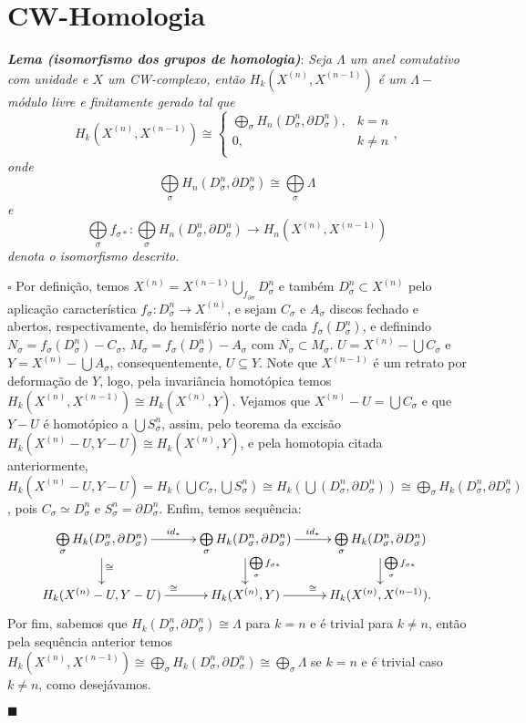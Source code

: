 \documentclass[12pt]{book}
\newcommand{\celula}[2]{D^{#1}_{#2}}
\newcommand{\celulabordo}[2]{\partial D^{#1}_{#2}}
\newcommand{\skeleton}[1]{X^{(#1)}}
\newcommand{\homologia}[2]{H_{#1}(#2)}
\newcommand{\homologiarel}[3]{H_{#1}(#2,#3)}
\newcommand{\homologiarelcel}[3]{H_{#1}(D^{#2}_{#3}, \partial D^{#2}_{#3})}
\newcommand{\homologiarelskelesimpl}[2]{H_{#1}(X^{(#2)}, X^{(#2-1)})}
\newcommand{\somadir}[1]{\bigoplus \limits_{#1}}
\newcommand{\tese}[3]{\vspace{2mm} \textit{\textbf{#1}}: \textit{#2} \par $\square$ #3 \par $\blacksquare$}
\begin{document}
	\section{CW-Homologia}
	\tese{Lema (isomorfismo dos grupos de homologia)}{Seja $\Lambda$ um anel comutativo com unidade e $X$ um CW-complexo, então $\homologiarelskelesimpl{k}{n} $ é um $\Lambda-$módulo livre e finitamente gerado tal que
	$$
	\homologiarelskelesimpl{k}{n} \cong 
	\left\{
		\begin{array}{cc}
		\somadir{\sigma} \homologiarelcel{n}{n}{\sigma} , & k = n\\
		0, & k\neq n\\
		\end{array}
	\right.,
	$$
	onde 
	$$
	\somadir{\sigma} \homologiarelcel{n}{n}{\sigma} \cong \somadir{\sigma} \Lambda
	$$
	e
	$$
	\somadir{\sigma}f_{\sigma*}: \somadir{\sigma} \homologiarelcel{n}{n}{\sigma} \to \homologiarelskelesimpl{n}{n}
	$$
	denota o isomorfismo descrito.}{Por definição, temos  $\skeleton{n} = \skeleton{n-1} \bigcup_{f_{\partial \sigma} } \celula{n}{\sigma}$ e também $\celula{n}{\sigma} \subset \skeleton{n}$ pelo aplicação característica $f_{\sigma} : \celula{n}{\sigma} \to \skeleton{n}$, e sejam $C_{\sigma}$ e $A_{\sigma}$ discos fechado e abertos, respectivamente, do hemisfério norte de cada $f_{\sigma}(\celula{n}{\sigma})$, e definindo $N_{\sigma} = f_{\sigma}(\celula{n}{\sigma}) - C_{\sigma}$, $M_{\sigma} = f_{\sigma}(\celula{n}{\sigma}) - A_{\sigma}$ com $\overline{N_{\sigma}} \subset M_{\sigma}$. $U = \skeleton{n} - \bigcup C_{\sigma}$ e $Y = \skeleton{n} - \bigcup A_{\sigma}$, consequentemente, $U \subseteq Y$. Note que $\skeleton{n-1}$ é um retrato por deformação de $Y$, logo, pela invariância homotópica temos $\homologiarel{k}{\skeleton{n}}{\skeleton{n-1}} \cong  \homologiarel{k}{\skeleton{n}}{Y}$. Vejamos que $\skeleton{n} - U = \bigcup C_{\sigma}$ e que $Y - U $ é homotópico a $\bigcup S^{n}_{\sigma}$, assim, pelo teorema da excisão $\homologiarel{k}{\skeleton{n} - U}{Y- U} \cong \homologiarel{k}{\skeleton{n}}{Y}$, e pela homotopia citada anteriormente, $\homologiarel{k}{\skeleton{n} - U}{Y- U} = \homologiarel{k}{\bigcup C_{\sigma}}{\bigcup S^{n}_{\sigma}} \cong \homologia{k}{\bigcup (\celula{n}{\sigma}, \celulabordo{n}{\sigma})} \cong \somadir{\sigma} \homologiarelcel{k}{n}{\sigma}$, pois $C_{\sigma} \simeq \celula{n}{\sigma}$ e $S^{n}_{\sigma} = \celulabordo{n}{\sigma}$. Enfim, temos sequência:
	\[
	\xymatrix{
		\somadir{\sigma} \homologiarelcel{k}{n}{\sigma} \ar[r]^{id_{*}} \ar[d]^{\cong} & 
		\somadir{\sigma} \homologiarelcel{k}{n}{\sigma} \ar[r]^{id_{*}} \ar[d]^{\somadir{\sigma}f_{\sigma*}} & 
		\somadir{\sigma} \homologiarelcel{k}{n}{\sigma} \ar[d]^{\somadir{\sigma}f_{\sigma*}} 
		\\
		\homologiarel{k}{\skeleton{n} - U}{Y- U} \ar[r]^{\cong} & \homologiarel{k}{\skeleton{n}}{Y} \ar[r]^{\cong} & 
		\homologiarelskelesimpl{k}{n}.
	}
	\]
	Por fim, sabemos que $\homologiarelcel{k}{n}{\sigma} \cong \Lambda$ para $k=n$ e é trivial para $k\neq n$, então pela sequência anterior temos $\homologiarelskelesimpl{k}{n} \cong \somadir{\sigma}\homologiarelcel{k}{n}{\sigma} \cong \somadir{\sigma} \Lambda$ se $k=n$ e é trivial caso $k\neq n$, como desejávamos.}
\end{document}
